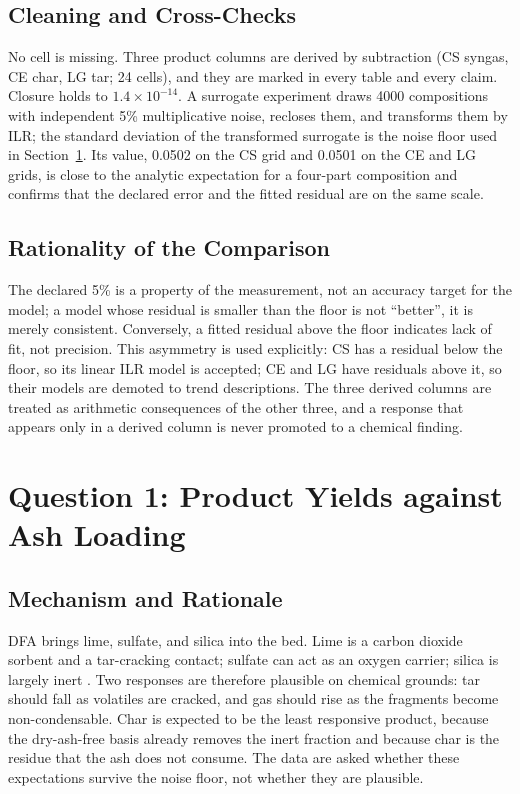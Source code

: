 \documentclass[withoutpreface,bwprint]{apmcmthesis}
\begin{document}
\subsection{Cleaning and Cross-Checks}
No cell is missing. Three product columns are derived by subtraction (CS syngas, CE char, LG tar; 24 cells), and they are marked in every table and every claim. Closure holds to $1.4\times10^{-14}$. A surrogate experiment draws 4000 compositions with independent 5\% multiplicative noise, recloses them, and transforms them by ILR; the standard deviation of the transformed surrogate is the noise floor used in Section~\ref{sec:q1}. Its value, 0.0502 on the CS grid and 0.0501 on the CE and LG grids, is close to the analytic expectation for a four-part composition and confirms that the declared error and the fitted residual are on the same scale.

\subsection{Rationality of the Comparison}
The declared 5\% is a property of the measurement, not an accuracy target for the model; a model whose residual is smaller than the floor is not ``better'', it is merely consistent. Conversely, a fitted residual above the floor indicates lack of fit, not precision. This asymmetry is used explicitly: CS has a residual below the floor, so its linear ILR model is accepted; CE and LG have residuals above it, so their models are demoted to trend descriptions. The three derived columns are treated as arithmetic consequences of the other three, and a response that appears only in a derived column is never promoted to a chemical finding.

\section{Question 1: Product Yields against Ash Loading}
\label{sec:q1}
\subsection{Mechanism and Rationale}
DFA brings lime, sulfate, and silica into the bed. Lime is a carbon dioxide sorbent and a tar-cracking contact; sulfate can act as an oxygen carrier; silica is largely inert \cite{Sutton2001,Blamey2010}. Two responses are therefore plausible on chemical grounds: tar should fall as volatiles are cracked, and gas should rise as the fragments become non-condensable. Char is expected to be the least responsive product, because the dry-ash-free basis already removes the inert fraction and because char is the residue that the ash does not consume. The data are asked whether these expectations survive the noise floor, not whether they are plausible.
\end{document}
